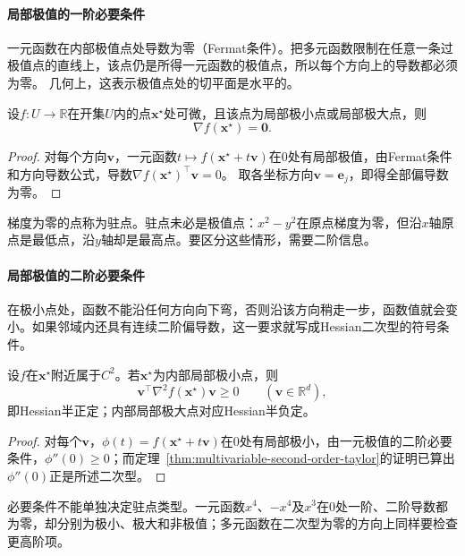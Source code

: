 \paragraph{局部极值的一阶必要条件}
一元函数在内部极值点处导数为零（Fermat条件）。把多元函数限制在任意一条过极值点的直线上，该点仍是所得一元函数的极值点，所以每个方向上的导数都必须为零。
几何上，这表示极值点处的切平面是水平的。
\begin{theorem}[局部极值的一阶必要条件]
\label{thm:multivariable-extremum-first-order}
设$f:U\to\mathbb R$在开集$U$内的点$\bm x^\star$处可微，且该点为局部极小点或局部极大点，则
\begin{equation}
 \nabla f(\bm x^\star)=\bm0.
\label{eq:analysis-first-order-necessary}
\end{equation}
\end{theorem}
\begin{proof}
对每个方向$\bm v$，一元函数$t\mapsto f(\bm x^\star+t\bm v)$在$0$处有局部极值，由Fermat条件和方向导数公式，导数$\nabla f(\bm x^\star)^\top\bm v=0$。
取各坐标方向$\bm v=\bm e_j$，即得全部偏导数为零。
\end{proof}
梯度为零的点称为驻点。驻点未必是极值点：$x^2-y^2$在原点梯度为零，但沿$x$轴原点是最低点，沿$y$轴却是最高点。要区分这些情形，需要二阶信息。

\paragraph{局部极值的二阶必要条件}
在极小点处，函数不能沿任何方向向下弯，否则沿该方向稍走一步，函数值就会变小。如果邻域内还具有连续二阶偏导数，这一要求就写成Hessian二次型的符号条件。
\begin{theorem}[局部极值的二阶必要条件]
\label{thm:multivariable-extremum-second-order}
设$f$在$\bm x^\star$附近属于$C^2$。若$\bm x^\star$为内部局部极小点，则
\begin{equation}
 \bm v^\top\nabla^2f(\bm x^\star)\bm v\geq0
 \qquad(\bm v\in\mathbb R^d),
\label{eq:analysis-second-order-necessary}
\end{equation}
即Hessian半正定；内部局部极大点对应Hessian半负定。
\end{theorem}
\begin{proof}
对每个$\bm v$，$\phi(t)=f(\bm x^\star+t\bm v)$在$0$处有局部极小，由一元极值的二阶必要条件，$\phi''(0)\geq0$；而定理~\ref{thm:multivariable-second-order-taylor}的证明已算出$\phi''(0)$正是所述二次型。
\end{proof}
必要条件不能单独决定驻点类型。一元函数$x^4$、$-x^4$及$x^3$在$0$处一阶、二阶导数都为零，却分别为极小、极大和非极值；多元函数在二次型为零的方向上同样要检查更高阶项。

